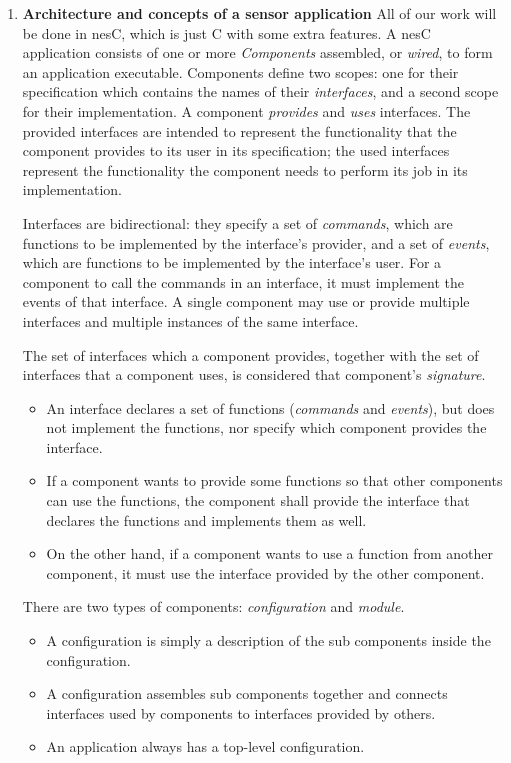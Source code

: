 \documentclass[letterpaper,12pt]{article}
\begin{document}
\begin{enumerate}
\item \textbf{Architecture and concepts of a sensor application}
    All of our work will be done in nesC, which is just C with some extra features.
    A nesC application consists of one or more \emph{Components} assembled, or \emph{wired},
    to form an application executable. Components define two scopes: one for
    their specification which contains the names of their \emph{interfaces},
    and a second scope for their implementation. A component \emph{provides} and \emph{uses}
    interfaces. The provided interfaces are intended to represent the
    functionality that the component provides to its user in its specification;
    the used interfaces represent the functionality the component needs to
    perform its job in its implementation.

    Interfaces are bidirectional: they specify a set of \emph{commands}, which
    are functions to be implemented by the interface's provider, and a set of
    \emph{events}, which are functions to be implemented by the interface's user.
    For a component to call the commands in an interface, it must implement the
    events of that interface. A single component may use or provide multiple
    interfaces and multiple instances of the same interface.

    The set of interfaces which a component provides, together with the set
    of interfaces that a component uses, is considered that component's \emph{signature}. 

   \begin{itemize}
      \item An interface declares a set of functions (\emph{commands} and \emph{events}), but does not implement the functions, nor specify which component provides the interface.
      \item If a component wants to provide some functions so that other components can use the functions, the component shall provide the interface that declares the functions and implements them as well.
      \item On the other hand, if a component wants to use a function from another component, it must use the interface provided by the other component.
   \end{itemize}

   There are two types of components: \emph{configuration} and \emph{module}.
   \begin{itemize}
      \item A configuration is simply a description of the sub components inside the configuration.
      \item A configuration assembles sub components together and connects interfaces used by components to interfaces provided by others.
      \item An application always has a top-level configuration.
   \end{itemize}


\end{enumerate}
\end{document}
